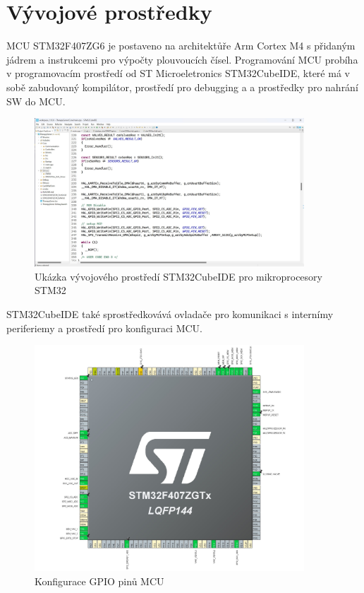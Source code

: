 \section{Vývojové prostředky}
MCU STM32F407ZG6 je postaveno na architektůře Arm Cortex M4 s přidaným jádrem a instrukcemi pro výpočty plouvoucích čísel.
Programování MCU probíha v programovacím prostředí od ST Microeletronics STM32CubeIDE, které má v sobě zabudovaný kompilátor, prostředí pro debugging a a prostředky pro nahrání SW do MCU.
\begin{figure}[H]
    \caption{Ukázka vývojového prostředí STM32CubeIDE pro mikroprocesory STM32}
    \includegraphics[width=0.9\textwidth]{pictures/cubeide.jpg}
\end{figure}
STM32CubeIDE také sprostředkovává ovladače pro komunikaci s internímy periferiemy a prostředí pro konfiguraci MCU.
\begin{figure}[H]
    \caption{Konfigurace GPIO pinů MCU}
    \includegraphics[width=0.9\textwidth]{pictures/mcu_settings.jpg}
\end{figure}
